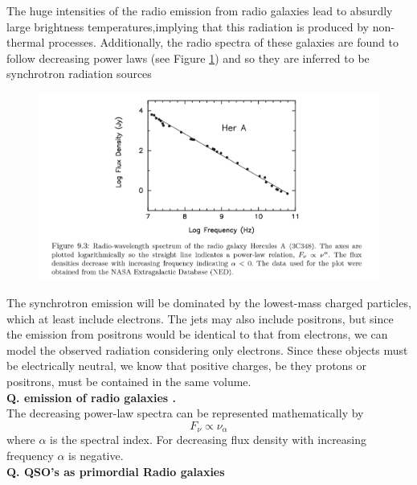 \documentclass[10pt]{report}
\newcommand{\tbf}[1]{\textbf{#1}}
\begin{document}
The huge intensities of the radio emission from radio galaxies lead to absurdly large brightness temperatures,implying that this radiation is produced by non-thermal processes. Additionally, the radio spectra of these galaxies are found to follow decreasing power laws (see Figure \ref{radiosyn}) and so they are inferred to be synchrotron radiation sources \\ 
\begin{figure}[h!]\label{radiosyn}
\includegraphics[scale=1]{radiosyn.png}
\end{figure}
The synchrotron emission will be dominated by the lowest-mass charged particles, which at least include electrons. The jets may also include positrons, but since the emission from positrons would be identical to that from electrons, we can model the observed radiation considering only electrons. Since these objects must be electrically neutral, we know that positive charges, be they protons or positrons, must be contained in the same volume. \\

\tbf{Q.  emission of radio galaxies .}\\

The decreasing power-law spectra can be represented mathematically by
\begin{equation}
F_\nu \propto \nu_\alpha
\end{equation}
where $\alpha$ is the spectral index.  For decreasing flux density with increasing frequency $\alpha$ is negative.\\

\tbf{Q.  QSO's as primordial Radio galaxies }\\
\end{document}
